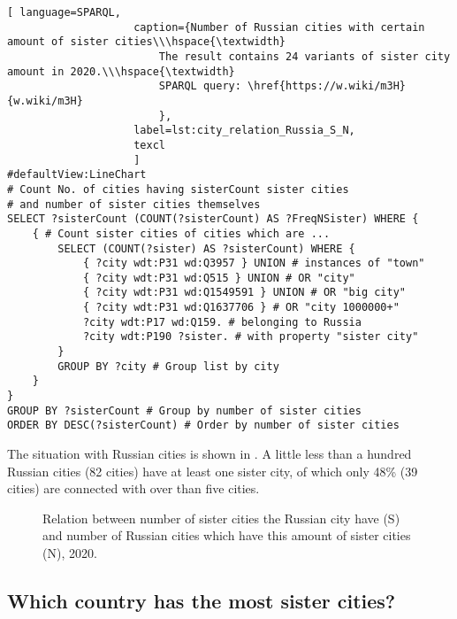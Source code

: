 \begin{lstlisting}[ language=SPARQL, 
                    caption={Number of Russian cities with certain amount of sister cities\\\hspace{\textwidth}
                        The result contains 24 variants of sister city amount in 2020.\\\hspace{\textwidth}
                        SPARQL query: \href{https://w.wiki/m3H}{w.wiki/m3H}
                        },
                    label=lst:city_relation_Russia_S_N,
                    texcl 
                    ]
#defaultView:LineChart                                                   
# Count No. of cities having sisterCount sister cities  
# and number of sister cities themselves
SELECT ?sisterCount (COUNT(?sisterCount) AS ?FreqNSister) WHERE {                                                                                  
	{ # Count sister cities of cities which are ...
		SELECT (COUNT(?sister) AS ?sisterCount) WHERE {    
			{ ?city wdt:P31 wd:Q3957 } UNION # instances of "town"
			{ ?city wdt:P31 wd:Q515 } UNION # OR "city"
			{ ?city wdt:P31 wd:Q1549591 } UNION # OR "big city"
			{ ?city wdt:P31 wd:Q1637706 } # OR "city 1000000+"
			?city wdt:P17 wd:Q159. # belonging to Russia
			?city wdt:P190 ?sister. # with property "sister city"
		}
		GROUP BY ?city # Group list by city                             
	}
}
GROUP BY ?sisterCount # Group by number of sister cities
ORDER BY DESC(?sisterCount) # Order by number of sister cities
\end{lstlisting}%

The situation with Russian cities is shown in . A little less than a hundred Russian cities (82 cities) have at least one sister city, of which only 48\% (39 cities) are connected with over than five cities.

\begin{figure}[H]
{
\setlength{\fboxsep}{0pt}%
\setlength{\fboxrule}{1pt}%
%
}
  \caption{Relation between number of sister cities the Russian city have (S) and number of Russian cities which have this amount of sister cities (N), 2020.}%
\end{figure}

\subsection{Which country has the most sister cities?}

